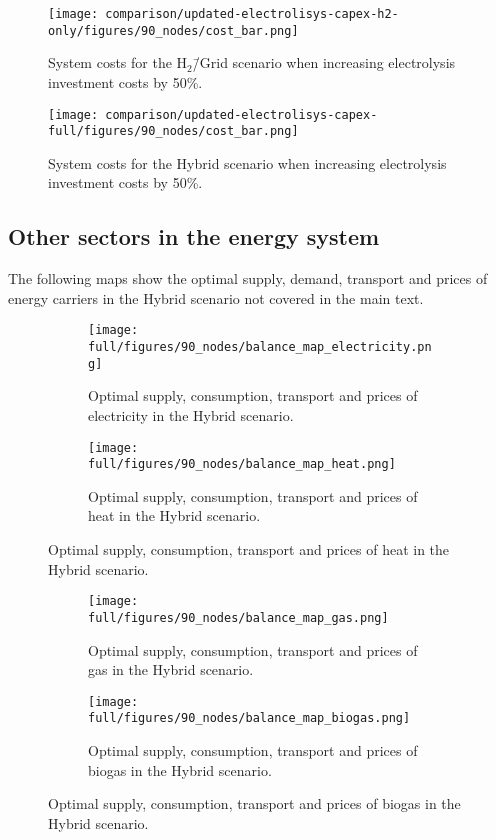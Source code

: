 \documentclass[twocolumn]{article}
\newcommand{\hydrogenscenario}{H$_2$\=/Grid scenario}
\newcommand{\hybridscenario}{Hybrid scenario}
\begin{document}
\begin{figure}[ht!]
    \centering
    \texttt{[image: comparison/updated-electrolisys-capex-h2-only/figures/90\_nodes/cost\_bar.png]}
    \caption{System costs for the \hydrogenscenario{} when increasing electrolysis investment costs by 50\%.}
    \label{fig:cost_bar_electrolysis_h2}
\end{figure}

\begin{figure}[ht!]
    \centering
    \texttt{[image: comparison/updated-electrolisys-capex-full/figures/90\_nodes/cost\_bar.png]}
    \caption{System costs for the \hybridscenario{} when increasing electrolysis investment costs by 50\%.}
    \label{fig:cost_bar_electrolysis_full}
\end{figure}


\clearpage
\subsection{Other sectors in the energy system}

The following maps show the optimal supply, demand, transport and prices of energy carriers in the \hybridscenario{} not covered in the main text.

\begin{figure}[ht!]
    \centering
    \begin{subfigure}{0.5\textwidth}
        \texttt{[image: full/figures/90\_nodes/balance\_map\_electricity.png]}
        \caption{Optimal supply, consumption, transport and prices of electricity in the \hybridscenario{}.}
        \label{fig:balance_map_electricity}
    \end{subfigure}%
    \begin{subfigure}{0.5\textwidth}
        \texttt{[image: full/figures/90\_nodes/balance\_map\_heat.png]}
        \caption{Optimal supply, consumption, transport and prices of heat in the \hybridscenario{}.}
        \label{fig:balance_map_heat}
    \end{subfigure}
\end{figure}

\begin{figure}[ht!]
    \centering
    \begin{subfigure}{0.5\textwidth}
        \texttt{[image: full/figures/90\_nodes/balance\_map\_gas.png]}
        \caption{Optimal supply, consumption, transport and prices of gas in the \hybridscenario{}.}
        \label{fig:balance_map_gas}
    \end{subfigure}%
    \begin{subfigure}{0.5\textwidth}
        \texttt{[image: full/figures/90\_nodes/balance\_map\_biogas.png]}
        \caption{Optimal supply, consumption, transport and prices of biogas in the \hybridscenario{}.}
        \label{fig:balance_map_biogas}
    \end{subfigure}
\end{figure}
\end{document}
